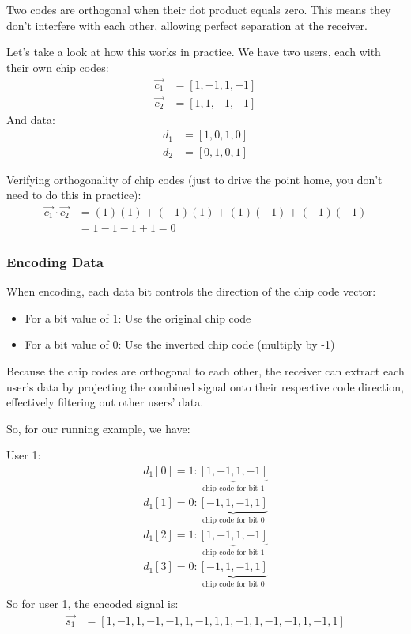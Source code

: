 \begin{importantblock}
    Two codes are orthogonal when their dot product equals zero. This means they don't interfere with each other, allowing perfect separation at the receiver.
\end{importantblock}

Let's take a look at how this works in practice. We have two users, each with their own chip codes:
\begin{align*}
\vec{c_1} &= [1, -1, 1, -1]\\
\vec{c_2} &= [1, 1, -1, -1]
\end{align*}
And data:
\begin{align*}
d_1 &= [1, 0, 1, 0]\\
d_2 &= [0, 1, 0, 1]
\end{align*}

Verifying orthogonality of chip codes (just to drive the point home, you don't need to do this in practice):
\begin{align*}
\vec{c_1} \cdot \vec{c_2} &= (1)(1) + (-1)(1) + (1)(-1) + (-1)(-1)\\
&= 1 - 1 - 1 + 1 = 0
\end{align*}

\subsubsection{Encoding Data}


When encoding, each data bit controls the direction of the chip code vector:
\begin{itemize}
    \item For a bit value of 1: Use the original chip code
    \item For a bit value of 0: Use the inverted chip code (multiply by -1)
\end{itemize}

Because the chip codes are orthogonal to each other, the receiver can extract each user's data by projecting the combined signal onto their respective code direction, effectively filtering out other users' data.

So, for our running example, we have:

User 1:
\begin{align*}
d_1[0]=1: \underbrace{[1, -1, 1, -1]}_{\text{chip code for bit 1}}\\
d_1[1]=0: \underbrace{[-1, 1, -1, 1]}_{\text{chip code for bit 0}}\\
d_1[2]=1: \underbrace{[1, -1, 1, -1]}_{\text{chip code for bit 1}}\\
d_1[3]=0: \underbrace{[-1, 1, -1, 1]}_{\text{chip code for bit 0}}\\
\end{align*}
So for user 1, the encoded signal is:
\begin{align*}
\vec{s_1} &= [1, -1, 1, -1, -1, 1, -1, 1, 1, -1, 1, -1, -1, 1, -1, 1]
\end{align*}

